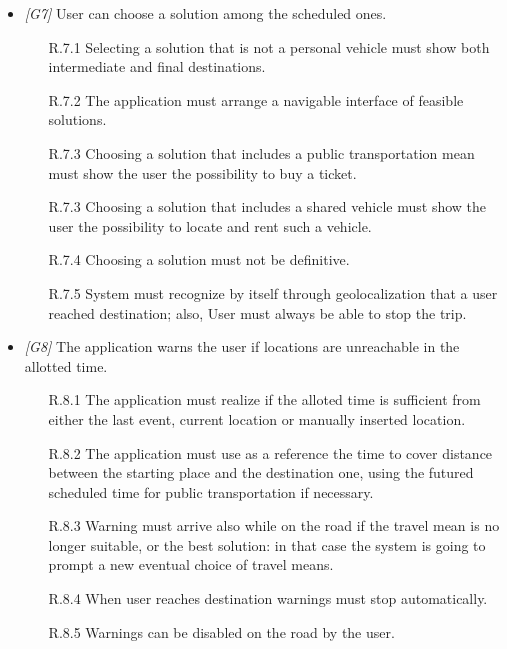 \begin{itemize}
                  
	\item \textit{[G7]} User can choose a solution among the scheduled ones. 
		\begin{itemize}
			\item [R.7.1] Selecting a solution that is not a personal vehicle must show both intermediate and final destinations.
			\item [R.7.2] The application must arrange a navigable interface of feasible solutions.
			\item [R.7.3] Choosing a solution that includes a public transportation mean must show the user the possibility to buy a ticket.
			\item [R.7.3] Choosing a solution that includes a shared vehicle must show the user the possibility to locate and rent such a vehicle.
			\item [R.7.4] Choosing a solution must not be definitive.
			\item [R.7.5] System must recognize by itself through geolocalization that a user reached destination; also, User must always be able to stop the trip.
		\end{itemize}
                  
                  
	\item \textit{[G8]} The application warns the user if locations are unreachable in the allotted time.
		\begin{itemize}
			\item[R.8.1] The application must realize if the alloted time is sufficient from either the last event, current location or manually inserted location.
			\item[R.8.2] The application must use as a reference the time to cover distance between the starting place and the destination one, using the futured scheduled time for public transportation if necessary.
			\item [R.8.3] Warning must arrive also while on the road if the travel mean is no longer suitable, or the best solution: in that case the system is going to prompt a new eventual choice of travel means.
			\item [R.8.4] When user reaches destination warnings must stop automatically.
			\item [R.8.5] Warnings can be disabled on the road by the user.
		\end{itemize}



\end{itemize}
